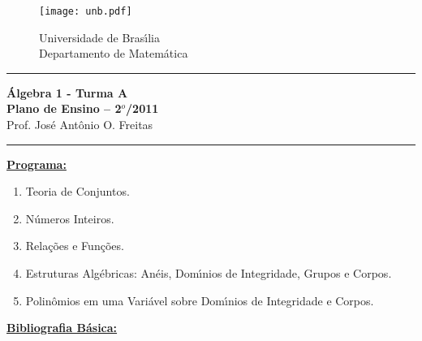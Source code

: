\documentclass{article}
\begin{document}
\pagestyle{empty}

\begin{figure}[h]
        \begin{minipage}[c]{1.7cm}
        \texttt{[image: unb.pdf]}
        \end{minipage}%
        \hspace{0pt}
        \begin{minipage}[c]{4in}
          {Universidade de Bras{\'\i}lia} \\
          {Departamento de Matem{\'a}tica}
\end{minipage}
\end{figure}
\vspace{-0.35cm} \hrule

\begin{center}
{\Large\bf {\'A}lgebra 1 - Turma A} \\ \vspace{9pt} {\large\bf Plano
de Ensino -- 2$^{o}$/2011}\\ \vspace{9pt} Prof. Jos{\'e} Ant{\^o}nio O. Freitas
\end{center}
\hrule

\vspace{9pt}
\noindent \textbf{\underline{Programa:}}
\begin{enumerate}[label={\arabic*})]

\item Teoria de Conjuntos.

\item N{\'u}meros Inteiros.

\item Rela{\c c}{\~o}es e Fun{\c c}{\~o}es.

\item Estruturas Alg{\'e}bricas: An{\'e}is, Dom{\'\i}nios de
  Integridade, Grupos e Corpos.

\item Polin{\^o}mios em uma Vari{\'a}vel sobre Dom{\'\i}nios de Integridade e Corpos.
\end{enumerate}

\vspace{9pt}
\noindent \textbf{\underline{Bibliografia B{\'a}sica:}}
\vspace{0.15cm}
\end{document}
